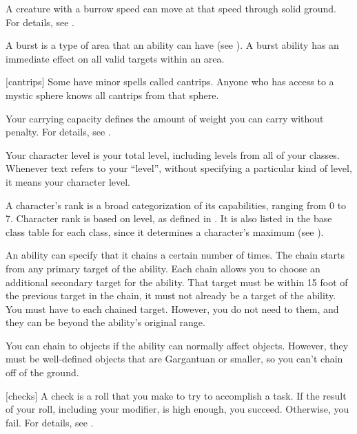  A creature with a burrow speed can move at that speed through solid ground.
For details, see .

 A burst is a type of area that an ability can have (see ).
A burst ability has an immediate effect on all valid targets within an area.

[cantrips] Some  have minor spells called cantrips.
Anyone who has access to a mystic sphere knows all cantrips from that sphere.

 Your carrying capacity defines the amount of weight you can carry without penalty.
For details, see .

 Your character level is your total level, including levels from all of your classes.
Whenever text refers to your ``level'', without specifying a particular kind of level, it means your character level.

 A character's rank is a broad categorization of its capabilities, ranging from 0 to 7.
Character rank is based on level, as defined in .
It is also listed in the base class table for each class, since it determines a character's maximum  (see ).

 An ability can specify that it chains a certain number of times.
The chain starts from any primary target of the ability.
Each chain allows you to choose an additional secondary target for the ability.
That target must be within 15 foot  of the previous target in the chain, it must not already be a target of the ability.
You must have  to each chained target.
However, you do not need  to them, and they can be beyond the ability's original range.

You can chain to objects if the ability can normally affect objects.
However, they must be well-defined objects that are Gargantuan or smaller, so you can't chain off of the ground.

[checks] A check is a roll that you make to try to accomplish a task.
If the result of your roll, including your modifier, is high enough, you succeed.
Otherwise, you fail.
For details, see .

